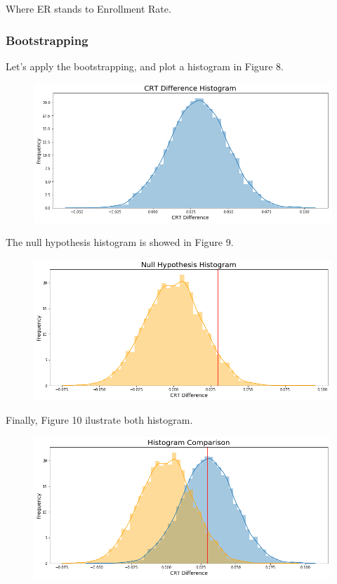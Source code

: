 \documentclass[]{book}
\begin{document}
Where ER stands to Enrollment Rate.

\subsubsection*{Bootstrapping}\label{bootstrapping-3}

Let's apply the bootstrapping, and plot a histogram in Figure 8.

\begin{figure}
\centering
\includegraphics{01-img/c4_l13_08.png}
\caption{}
\end{figure}

The null hypothesis histogram is showed in Figure 9.

\begin{figure}
\centering
\includegraphics{01-img/c4_l13_09.png}
\caption{}
\end{figure}

Finally, Figure 10 ilustrate both histogram.

\begin{figure}
\centering
\includegraphics{01-img/c4_l13_10.png}
\caption{}
\end{figure}
\end{document}
